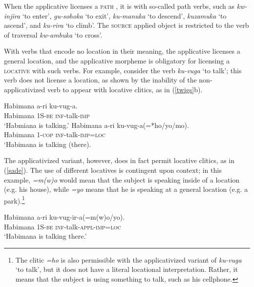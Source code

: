 \documentclass[output=paper]{langsci/langscibook}
\begin{document}
When the applicative licenses a {\scshape path} , it is with so-called path verbs, such as \emph{kw-injira} `to enter', \emph{gu-sohoka} `to exit', \emph{ku-manuka} `to descend', \emph{kuzamuka} `to ascend', and \emph{ku-rira} `to climb'. The {\scshape source} applied object is restricted to the verb of traversal \emph{kw-ambuka} `to cross'.


With verbs that encode no location in their meaning, the applicative licenses a general location, and the applicative morpheme is obligatory for licensing a {\scshape locative} with such verbs. For example, consider the verb \emph{ku-vuga} `to talk'; this verb does not license a location, as shown by the inability of the non-applicativized verb to appear with locative clitics, as in (\ref{twigs}b). 

\begin{exe}
      \ex\label{twigs}\begin{xlist}
	      \ex\gll Habimana a-ri ku-vug-a.\\	
			      Habimana 1S-{\scshape be} {\scshape inf}-talk-{\scshape imp}\\
			      \glt `Habmiana is talking.'
      \ex\gll Habimana  a-ri ku-vug-a(=*ho/yo/mo).\\
					      Habimana {\scshape 1-cop} {\scshape inf-}talk-{\scshape imp=loc}\\
					      \glt `Habimana is talking (there).
\end{xlist}
\end{exe}
%
The applicativized variant, however, does in fact permit locative clitics, as in (\ref{sade}). The use of different locatives is contingent upon context; in this example, \emph{=m(w)o} would mean that the subject is speaking inside of a location (e.g. his house), while \emph{=yo} means that he is speaking at a general location (e.g. a park).\footnote{The clitic \emph{=ho} is also permissible with the applicativized variant of \emph{ku-vuga} `to talk', but it does not have a literal locational interpretation. Rather, it means that the subject is using something to talk, such as his cellphone.}

\begin{exe}
	      \ex\label{sade}\gll Habimana a-ri ku-vug-ir-a(=m(w)o/yo).\\
		      Habimana 1S-{\scshape be} {\scshape inf}-talk-{\scshape appl-imp=loc}\\
			      \glt `Habimana is talking there.' 
      \end{exe}
\end{document}
